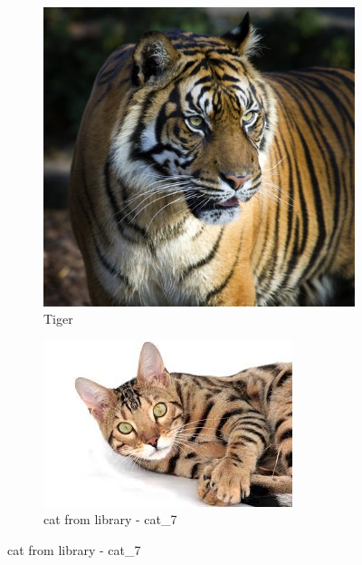 \documentclass[a4paper]{iacas}
\begin{document}
\vskip 0.1in
\begin{figure}[!htbp]
	\begin{subfigure}{0.4\linewidth}
		\centering
		\includegraphics[width=\linewidth,scale=0.8]{imgs/tiger.jpg}
		\caption{Tiger}
	\end{subfigure}
	\begin{subfigure}{0.4\linewidth}
		\centering
		\includegraphics[width=\linewidth,scale=0.8]{imgs/cat_7.jpg}
		\caption{cat from library - cat\_7}
	\end{subfigure}


\end{figure}
\end{document}
